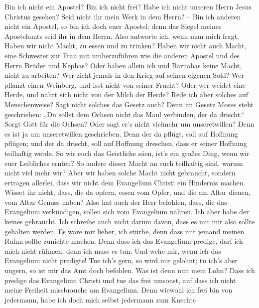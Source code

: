  Bin ich nicht ein Apostel? Bin ich nicht frei? Habe ich
nicht unseren Herrn Jesus Christus gesehen? Seid nicht ihr mein Werk in
dem Herrn? --  Bin ich anderen nicht ein Apostel, so bin
ich doch euer Apostel; denn das Siegel meines Apostelamts seid ihr in
dem Herrn.  Also antworte ich, wenn man mich fragt.
 Haben wir nicht Macht, zu essen und zu trinken?
 Haben wir nicht auch Macht, eine Schwester zur Frau mit
umherzuführen wie die anderen Apostel und des Herrn Brüder und Kephas?
 Oder haben allein ich und Barnabas keine Macht, nicht zu
arbeiten?  Wer zieht jemals in den Krieg auf seinen
eigenen Sold? Wer pflanzt einen Weinberg, und isst nicht von seiner
Frucht? Oder wer weidet eine Herde, und nährt sich nicht von der Milch
der Herde?  Rede ich aber solches auf Menschenweise? Sagt
nicht solches das Gesetz auch?  Denn im Gesetz Moses steht
geschrieben: „Du sollst dem Ochsen nicht das Maul verbinden, der da
drischt.`` Sorgt Gott für die Ochsen?  Oder sagt er's
nicht vielmehr um unseretwillen? Denn es ist ja um unseretwillen
geschrieben. Denn der da pflügt, soll auf Hoffnung pflügen; und der da
drischt, soll auf Hoffnung dreschen, dass er seiner Hoffnung teilhaftig
werde.  So wir euch das Geistliche säen, ist's ein großes
Ding, wenn wir euer Leibliches ernten?  So andere dieser
Macht an euch teilhaftig sind, warum nicht viel mehr wir? Aber wir haben
solche Macht nicht gebraucht, sondern ertragen allerlei, dass wir nicht
dem Evangelium Christi ein Hindernis machen.  Wisset ihr
nicht, dass, die da opfern, essen vom Opfer, und die am Altar dienen,
vom Altar Genuss haben?  Also hat auch der Herr befohlen,
dass, die das Evangelium verkündigen, sollen sich vom Evangelium nähren.
 Ich aber habe der keines gebraucht. Ich schreibe auch
nicht darum davon, dass es mit mir also sollte gehalten werden. Es wäre
mir lieber, ich stürbe, denn dass mir jemand meinen Ruhm sollte zunichte
machen.  Denn dass ich das Evangelium predige, darf ich
mich nicht rühmen; denn ich muss es tun. Und wehe mir, wenn ich das
Evangelium nicht predigte!  Tue ich's gern, so wird mir
gelohnt; tu ich's aber ungern, so ist mir das Amt doch befohlen.
 Was ist denn nun mein Lohn? Dass ich predige das
Evangelium Christi und tue das frei umsonst, auf dass ich nicht meine
Freiheit missbrauche am Evangelium.  Denn wiewohl ich
frei bin von jedermann, habe ich doch mich selbst jedermann zum Knechte
